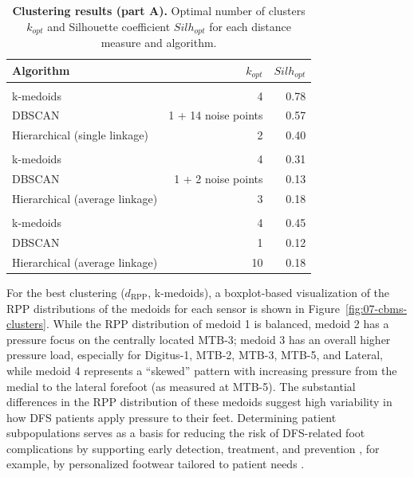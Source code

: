 \documentclass[
  oneside]{book}
\begin{document}
\begin{table}

\caption{\label{tab:07-results-cbms}\textbf{Clustering results (part A).} Optimal number of clusters \(k_{opt}\) and Silhouette coefficient \(Silh_{opt}\) for each distance measure and algorithm.}
\centering
\begin{tabular}[t]{lrr}
\toprule
Algorithm & $k_{opt}$ & $Silh_{opt}$\\
\midrule
\addlinespace[0.3em]
\multicolumn{3}{l}{\textbf{$d_{\text{RPP}}$}}\\
\hspace{1em}k-medoids & 4 & 0.78\\
\hspace{1em}DBSCAN & 1 + 14 noise points & 0.57\\
\hspace{1em}Hierarchical (single linkage) & 2 & 0.40\\
\addlinespace[0.3em]
\multicolumn{3}{l}{\textbf{$d_{\text{pairs}}$}}\\
\hspace{1em}k-medoids & 4 & 0.31\\
\hspace{1em}DBSCAN & 1 + 2 noise points & 0.13\\
\hspace{1em}Hierarchical (average linkage) & 3 & 0.18\\
\addlinespace[0.3em]
\multicolumn{3}{l}{\textbf{$d_{\text{centers}}$}}\\
\hspace{1em}k-medoids & 4 & 0.45\\
\hspace{1em}DBSCAN & 1 & 0.12\\
\hspace{1em}Hierarchical (average linkage) & 10 & 0.18\\
\bottomrule
\end{tabular}
\end{table}

For the best clustering (\(d_{\text{RPP}}\), k-medoids), a boxplot-based visualization of the RPP distributions of the medoids for each sensor is shown in Figure~\ref{fig:07-cbms-clusters}.
While the RPP distribution of medoid 1 is balanced, medoid 2 has a pressure focus on the centrally located MTB-3; medoid 3 has an overall higher pressure load, especially for Digitus-1, MTB-2, MTB-3, MTB-5, and Lateral, while medoid 4 represents a ``skewed'' pattern with increasing pressure from the medial to the lateral forefoot (as measured at MTB-5).
The substantial differences in the RPP distribution of these medoids suggest high variability in how DFS patients apply pressure to their feet.
Determining patient subpopulations serves as a basis for reducing the risk of DFS-related foot complications by supporting early detection, treatment, and prevention \autocite{BarnEtAl:PLOS15,WaaijmanEtAl:RiskFactorsUlcerRecurrence,Bus:OffloadingDiabeticFoot2012,DeschampsEtAL:KMeansDiabeticFoot2013,LaveryEtAl:DiabetesCare2003,CavanaghEtAl:OffLoading2010}, for example, by personalized footwear tailored to patient needs \autocite{BennettsEtAl:Biomechanics2013}.
\end{document}
